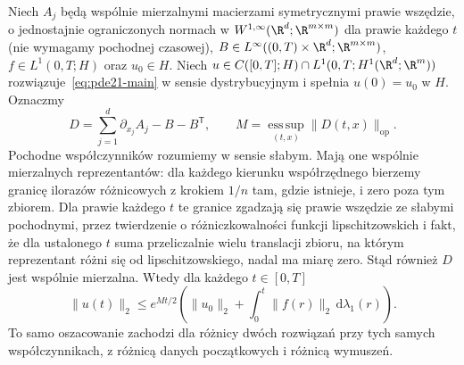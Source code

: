 \begin{twierdzenie}\label{thm:pde21-energy}
Niech $A_j$ będą wspólnie mierzalnymi macierzami
symetrycznymi prawie wszędzie, o jednostajnie ograniczonych
normach w $W^{1,\infty}(\R^d;\R^{m\times m})$
dla prawie każdego $t$ (nie wymagamy pochodnej czasowej),
$B\in L^\infty((0,T)\times\R^d;\R^{m\times m})$,
$f\in L^1(0,T;H)$ oraz $u_0\in H$.
Niech $u\in C([0,T];H)\cap L^1(0,T;H^1(\R^d;\R^m))$
rozwiązuje~\eqref{eq:pde21-main} w sensie dystrybucyjnym
i spełnia $u(0)=u_0$ w $H$.
Oznaczmy
\[
 D=\sum_{j=1}^d\partial_{x_j}A_j-B-B^\mathsf T,\qquad
 M=\operatorname*{ess\,sup}_{(t,x)}
       \|D(t,x)\|_{\mathrm{op}}.
\]
Pochodne współczynników rozumiemy w sensie słabym.
Mają one wspólnie mierzalnych reprezentantów:
dla każdego kierunku współrzędnego bierzemy granicę
ilorazów różnicowych z krokiem $1/n$ tam, gdzie
istnieje, i zero poza tym zbiorem. Dla prawie każdego
$t$ te granice zgadzają się prawie wszędzie ze
słabymi pochodnymi, przez twierdzenie o
różniczkowalności funkcji lipschitzowskich
i fakt, że dla ustalonego $t$ suma przeliczalnie
wielu translacji zbioru, na którym reprezentant
różni się od lipschitzowskiego, nadal ma miarę zero.
Stąd również $D$ jest wspólnie mierzalna.
Wtedy dla każdego $t\in[0,T]$
\begin{equation}\label{eq:pde21-L2}
 \|u(t)\|_2\le e^{Mt/2}\left(\|u_0\|_2+
 \int_0^t\|f(r)\|_2\,\mathrm d\lambda_1(r)\right).
\end{equation}
To samo oszacowanie zachodzi dla różnicy dwóch rozwiązań
przy tych samych współczynnikach, z różnicą danych
początkowych i różnicą wymuszeń.
\end{twierdzenie}
